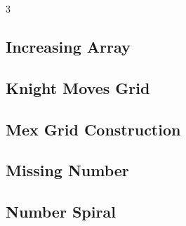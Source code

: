 \documentclass[8pt]{extarticle}
\begin{document}
\begin{multicols*}{3}
\subsection{Increasing Array}
\begin{caixaenunciado}

\end{caixaenunciado}
\vspace{0.3cm}


\subsection{Knight Moves Grid}
\begin{caixaenunciado}

\end{caixaenunciado}
\vspace{0.3cm}


\subsection{Mex Grid Construction}
\begin{caixaenunciado}

\end{caixaenunciado}
\vspace{0.3cm}


\subsection{Missing Number}
\begin{caixaenunciado}

\end{caixaenunciado}
\vspace{0.3cm}


\subsection{Number Spiral}
\begin{caixaenunciado}

\end{caixaenunciado}
\vspace{0.3cm}



\end{multicols*}
\end{document}
